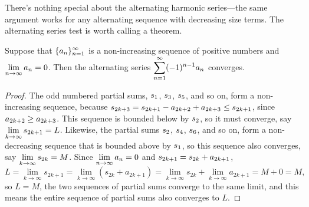 
There's nothing special about the alternating harmonic series---the
same argument works for any alternating sequence with decreasing size
terms. The alternating series test is worth calling a theorem.

\begin{theorem} Suppose that $\displaystyle\{a_n\}_{n=1}^\infty$ is a non-increasing
sequence of positive numbers and $\displaystyle\lim_{n\to\infty}a_n=0$. Then the
alternating series $\displaystyle\sum_{n=1}^\infty (-1)^{n-1} a_n$ converges.
\end{theorem}

\begin{proof} The odd numbered partial sums, $\displaystyle s_1$, $\displaystyle s_3$, $\displaystyle s_5$,
and so on, form a non-increasing sequence, because
$\displaystyle s_{2k+3}=s_{2k+1}-a_{2k+2}+a_{2k+3}\le s_{2k+1}$, since
$\displaystyle a_{2k+2}\ge a_{2k+3}$. This sequence is bounded below by
$\displaystyle s_2$, so it must converge, say 
$\displaystyle\lim_{k\to\infty}s_{2k+1}=L$.
Likewise, the partial sums $\displaystyle s_2$, $\displaystyle s_4$, $\displaystyle s_6$,
and so on, form a non-decreasing sequence that is bounded above by
$\displaystyle s_1$, so this sequence also converges, say 
$\displaystyle\lim_{k\to\infty}s_{2k}=M$. Since $\displaystyle\lim_{n\to\infty} a_n=0$ and
$\displaystyle s_{2k+1}= s_{2k}+a_{2k+1}$,
$$
  L=\lim_{k\to\infty}s_{2k+1}=\lim_{k\to\infty}(s_{2k}+a_{2k+1})=
  \lim_{k\to\infty}s_{2k}+\lim_{k\to\infty}a_{2k+1}=M+0=M,
$$
so $L=M$, the two sequences of partial sums converge to the same
limit, and this means the entire sequence of partial sums also
converges to $L$.
\end{proof}

